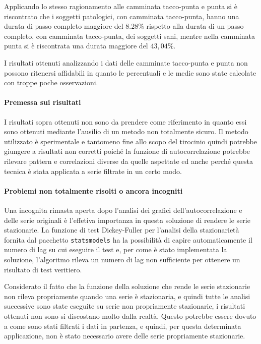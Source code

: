 Applicando lo stesso ragionamento alle camminata tacco-punta e punta si è riscontrato che 
i soggetti patologici, con camminata tacco-punta, hanno una durata di passo completo maggiore del 
$8.28\%$ rispetto alla durata di un passo completo, con camminata tacco-punta, dei soggetti sani, 
mentre nella camminata punta si è riscontrata una durata maggiore del $43,04\%$.

I risultati ottenuti analizzando i dati delle camminate tacco-punta e punta non possono ritenersi affidabili
in quanto le percentuali e le medie sono state calcolate con troppe poche osservazioni.


\paragraph*{Premessa sui risultati}
I risultati sopra ottenuti non sono da prendere come riferimento in quanto essi sono ottenuti
mediante l'ausilio di un metodo non totalmente sicuro. Il metodo utilizzato è sperimentale e tantomeno 
fine allo scopo del tirocinio quindi potrebbe giungere a risultati non corretti 
poiché la funzione di autocorrelazione potrebbe rilevare pattern e correlazioni diverse da quelle
aspettate ed anche perché questa tecnica è stata applicata a serie filtrate in un certo modo.

\paragraph*{Problemi non totalmente risolti o ancora incogniti}
Una incognita rimasta aperta dopo l'analisi dei grafici dell'autocorrelazione e delle serie originali
è l'effetiva importanza in questa soluzione di rendere le serie stazionarie. 
La funzione di test Dickey-Fuller per l'analisi della stazionarietà fornita dal 
pacchetto \texttt{statsmodels} ha la possibilità
di capire automaticamente il numero di lag su cui eseguire il test e, per come è stato implementata
la soluzione, l'algoritmo rileva un numero di lag non sufficiente per ottenere un risultato 
di test veritiero.

Considerato il fatto che la funzione della soluzione che rende le serie stazionarie non 
rileva propriamente quando una serie è stazionaria, e quindi tutte le analisi successive
sono state eseguite su serie non propriamente stazionarie, i risultati ottenuti non sono
si discostano molto dalla realtà. Questo potrebbe essere dovuto a come sono stati
filtrati i dati in partenza, e quindi, per questa determinata applicazione, non è stato necessario 
avere delle serie propriamente stazionarie.


